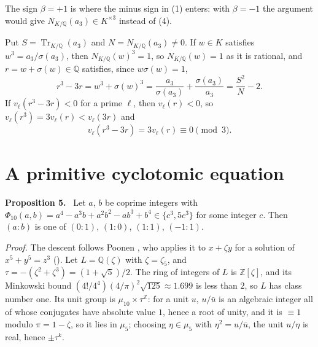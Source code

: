 \documentclass[11pt]{article}
\newenvironment{statement}[1]{\par\medskip\noindent\phantomsection\textbf{#1}\ }{\par\medskip}
\newcommand{\Q}{\mathbb Q}
\newcommand{\Z}{\mathbb Z}
\begin{document}
\medskip
The sign \(\beta=+1\) is where the minus sign in (1) enters: with \(\beta=-1\) the argument would give
\(N_{K/\Q}(a_3)\in K^{\times3}\) instead of (4).

Put \(S=\operatorname{Tr}_{K/\Q}(a_3)\) and \(N=N_{K/\Q}(a_3)\neq0\). If \(w\in K\) satisfies
\(w^3=a_3/\sigma(a_3)\), then \(N_{K/\Q}(w)^3=1\), so \(N_{K/\Q}(w)=1\) as it is rational, and
\(r=w+\sigma(w)\in\Q\) satisfies, since \(w\sigma(w)=1\),
\[r^3-3r=w^3+\sigma(w)^3=\frac{a_3}{\sigma(a_3)}+\frac{\sigma(a_3)}{a_3}=\frac{S^2}{N}-2.\tag{5}\]
If \(v_\ell(r^3-3r)<0\) for a prime \(\ell\), then \(v_\ell(r)<0\), so \(v_\ell(r^3)=3v_\ell(r)<v_\ell(3r)\)
and
\[v_\ell(r^3-3r)=3v_\ell(r)\equiv0\pmod3.\tag{6}\]

\section{A primitive cyclotomic equation}\label{cyclotomic}

\begin{statement}{Proposition 5.}\label{prop-cyclo}
Let \(a\), \(b\) be coprime integers with
\(\Phi_{10}(a,b)=a^4-a^3b+a^2b^2-ab^3+b^4\in\{c^3,5c^3\}\) for some integer \(c\). Then
\((a:b)\) is one of \((0:1)\), \((1:0)\), \((1:1)\), \((-1:1)\).
\end{statement}

\emph{Proof.} The descent follows Poonen \cite[Section~4]{Po}, who applies it to \(x+\zeta y\) for a
solution of \(x^5+y^5=z^3\) (\cite[(15), p.~198, and p.~199]{Po}). Let \(L=\Q(\zeta)\) with
\(\zeta=\zeta_5\), and \(\tau=-(\zeta^2+\zeta^3)=(1+\sqrt5)/2\). The ring of integers of \(L\) is
\(\Z[\zeta]\), and its Minkowski bound \((4!/4^4)(4/\pi)^2\sqrt{125}\approx1.699\) is less than \(2\),
so \(L\) has class number one. Its unit group is \(\mu_{10}\times\tau^{\Z}\): for a unit \(u\),
\(u/\bar u\) is an algebraic integer all of whose conjugates have absolute value \(1\), hence a root
of unity, and it is \(\equiv1\) modulo \(\pi=1-\zeta\), so it lies in \(\mu_5\); choosing
\(\eta\in\mu_5\) with \(\eta^2=u/\bar u\), the unit \(u/\eta\) is real, hence \(\pm\tau^k\).
\end{document}
